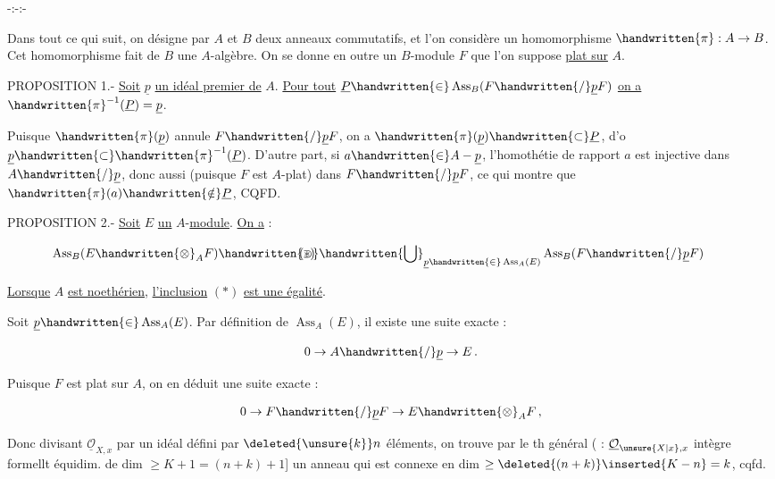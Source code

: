 \begin{center}-:-:-\end{center}

Dans tout ce qui suit, on désigne par $A$ et $B$ deux anneaux commutatifs, et l'on considère un homomorphisme $\handwritten{\pi}:A\to B$. Cet homomorphisme fait de $B$ une $A$-algèbre. On se donne en outre un $B$-module $F$ que l'on suppose \uline{plat sur} $A$.

PROPOSITION 1.- \uline{Soit} $\underline p$ \uline{un idéal premier de} $A$. \uline{Pour tout} $\underline P\handwritten{\in}\operatorname{Ass}_B(F\handwritten{/}\underline p F)$ \uline{on a} $\handwritten{\pi}^{-1}(\underline P)=\underline p$.

Puisque $\handwritten{\pi}(\underline p)$ annule $F\handwritten{/}\underline p F$, on a $\handwritten{\pi}(\underline p)\handwritten{\subset}\underline P$, d'o $\underline p\handwritten{\subset}\handwritten{\pi}^{-1}(\underline P)$. D'autre part, si $a\handwritten{\in} A-\underline p$, l'homothétie de rapport $a$ est injective dans $A\handwritten{/}\underline p$, donc aussi (puisque $F$ est $A$-plat) dans $F\handwritten{/}\underline p F$, ce qui montre que $\handwritten{\pi}(a)\handwritten{\notin}\underline P$, CQFD.

PROPOSITION 2.- \uline{Soit} $E$ \uline{un} $A$-\uline{module}. \uline{On a} :

\[
\operatorname{Ass}_B(E\handwritten{\otimes}_A F)\handwritten{\supset}\handwritten{\bigcup}_{\underline p\handwritten{\in}\operatorname{Ass}_A(E)}\operatorname{Ass}_B(F\handwritten{/}\underline p F)
\tag*{\makebox[0pt][r]{\makebox[\linewidth][l]{$(\ast)$}}}
\]

\uline{Lorsque} $A$ \uline{est noethérien}, \uline{l'inclusion} $(\ast)$ \uline{est une égalité}.

Soit $\underline p\handwritten{\in}\operatorname{Ass}_A(E)$. Par définition de $\operatorname{Ass}_A(E)$, il existe une suite exacte :

\[
0\to A\handwritten{/}\underline p\to E\,.
\]

Puisque $F$ est plat sur $A$, on en déduit une suite exacte :

\[
0\to F\handwritten{/}\underline p F\to E\handwritten{\otimes}_A F\,,
\]


Donc divisant $\underline{\mathcal O}_{X,x}$ par un idéal défini par $\deleted{\unsure{k}}n$ éléments, on  trouve par le th général  ( : $\underline{\mathcal O}_{\unsure{X|x},x}$ intègre formellt équidim. de dim $\geq K+1=(n+k)+1$] un anneau qui est connexe en dim $\geq\deleted{(n+k)}\inserted{K-n}=k$, cqfd.

